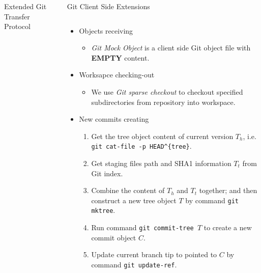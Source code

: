 \documentclass[final]{beamer}
\begin{document}
\begin{frame}[t, fragile]
\begin{columns}[t]
\begin{column}{.49\linewidth}
\begin{block}{Extended Git Transfer Protocol}
      \end{block}
    \end{column}
    \begin{column}{.49\linewidth}
      \begin{block}{Git Client Side Extensions}
        \begin{columns}[T]
            \begin{column}{.5\textwidth}
\begin{itemize}
  \justifying
  \item Objects receiving
    \begin{itemize}
      \item \emph{Git Mock Object} is a client side Git object file with
        \textbf{EMPTY} content.
    \end{itemize}
  \item Worksapce checking-out
    \begin{itemize}
    \item We use \emph{Git sparse checkout} to checkout specified
      subdirectories from repository into workspace.
    \end{itemize}
  \item New commits creating
\begin{enumerate}
  \item Get the tree object content of current version $T_h$, i.e. \\
        \verb|git cat-file -p HEAD^{tree}|.

  \item Get staging files path and SHA1 information $T_t$ from Git index.

  \item Combine the content of $T_h$ and $T_t$ together; and then construct a
        new tree object $T$ by command \verb|git mktree|.

  \item Run command \verb|git commit-tree |$T$ to create a new commit object
        $C$.

  \item Update current branch tip to pointed to $C$ by command
    \verb|git update-ref|.
\end{enumerate}
\end{itemize}


\end{column}
\end{columns}
\end{block}
\end{column}
\end{columns}
\end{frame}
\end{document}
